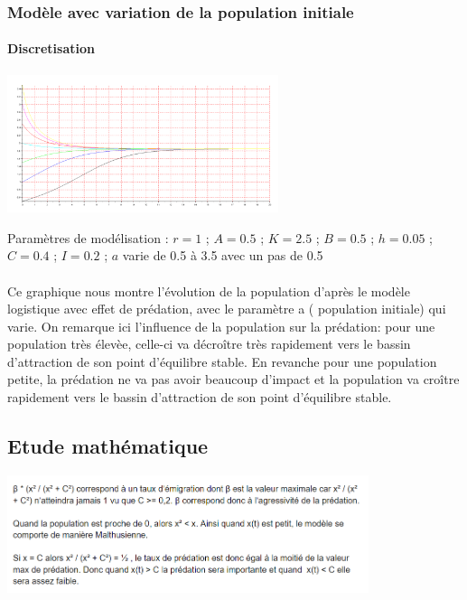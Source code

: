 \documentclass{article}
\begin{document}
\subsubsection{Modèle avec variation de la population initiale}

\paragraph{Discretisation}
\begin{center}
\includegraphics[width=300px]{img/part2/TrajPop.png}
\end{center}
Paramètres de modélisation : $r=1$ ; $A=0.5$ ; $K=2.5$ ; $B=0.5$ ; $h=0.05$ ; $C=0.4$ ; $I=0.2$ ; $a$ varie de 0.5 à 3.5 avec un pas de 0.5
\paragraph{}
Ce graphique nous montre l'évolution de la population d'après le modèle logistique avec effet de prédation, avec le paramètre a ( population initiale) qui varie. On remarque ici l'influence de la population sur la prédation: pour une population très élevèe, celle-ci va décroître très rapidement vers le bassin d'attraction de son point d'équilibre stable. En revanche pour une population petite, la prédation ne va pas avoir beaucoup d'impact et la population va croître rapidement vers le bassin d'attraction de son point d'équilibre stable.

\subsection{Etude mathématique}

\begin{center}
\includegraphics[width=400px]{3.png}
\end{center}
\end{document}
